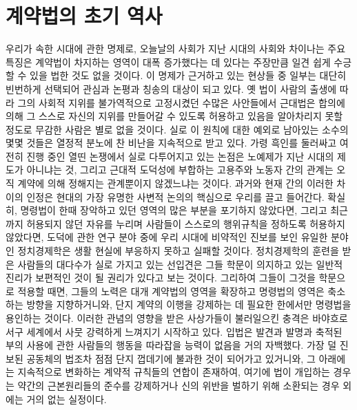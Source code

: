 \chapter{계약법의 초기 역사}

우리가 속한 시대에 관한 명제로,
오늘날의 사회가
지난 시대의 사회와 차이나는 주요 특징은
계약법이 차지하는 영역이 대폭 증가했다는 데 있다는
주장만큼
일견 쉽게 수긍할 수 있을 법한 것도 없을 것이다.
이 명제가 근거하고 있는 현상들 중 일부는
대단히 빈번하게 선택되어 관심과 논평과 칭송의 대상이 되고 있다.
옛 법이 사람의 출생에 따라 그의 사회적 지위를
불가역적으로 고정시켰던 수많은 사안들에서
근대법은 합의에 의해 그 스스로 자신의 지위를 만들어갈 수 있도록
허용하고 있음을
알아차리지 못할 정도로
무감한 사람은
별로 없을 것이다.
실로 이 원칙에 대한 예외로 남아있는 소수의 몇몇 것들은
열정적 분노에 찬 비난을 지속적으로 받고 있다.
가령 흑인를 둘러싸고 여전히 진행 중인 열띤 논쟁에서
실로 다투어지고 있는 논점은
노예제가 지난 시대의 제도가 아니냐는 것,
그리고
근대적 도덕성에 부합하는
고용주와 노동자 간의 관계는
오직 계약에 의해 정해지는 관계뿐이지 않겠느냐는 것이다.
과거와 현재 간의 이러한 차이의 인정은
현대의 가장 유명한 사변적 논의의 핵심으로 우리를 끌고 들어간다.
확실히,
명령법이
한때 장악하고 있던 영역의 많은 부분을
포기하지 않았다면,
그리고
최근까지 허용되지 않던 자유를 누리며
사람들이 스스로의 행위규칙을 정하도록 허용하지 않았다면,
도덕에 관한 연구 분야 중에
우리 시대에 비약적인 진보를 보인 유일한 분야인
정치경제학은
생활 현실에 부응하지 못하고 실패할 것이다.
정치경제학의 훈련을 받은 사람들의 대다수가
실로 가지고 있는 선입견은
그들 학문이 의지하고 있는 일반적 진리가
보편적인 것이 될 권리가 있다고 보는 것이다.
그리하여 그들이 그것을 학문으로 적용할 때면,
그들의 노력은 대개 계약법의 영역을 확장하고
명령법의 영역은 축소하는 방향을 지향하거니와,
단지 계약의 이행을 강제하는 데 필요한 한에서만
명령법을 용인하는 것이다.
이러한 관념의 영향을 받은 사상가들이 불러일으킨 충격은
바야흐로 서구 세계에서 사뭇 강력하게 느껴지기 시작하고 있다.
입법은
발견과 발명과 축적된 부의 사용에 관한 사람들의 행동을
따라잡을 능력이 없음을
거의 자백했다.
가장 덜 진보된 공동체의 법조차
점점 단지 껍데기에 불과한 것이 되어가고 있거니와,
그 아래에는
지속적으로 변화하는 계약적 규칙들의 연합이 존재하여,
여기에 법이 개입하는 경우는
약간의 근본원리들의 준수를 강제하거나
신의 위반을 벌하기 위해 소환되는 경우 외에는
거의 없는 실정이다.

